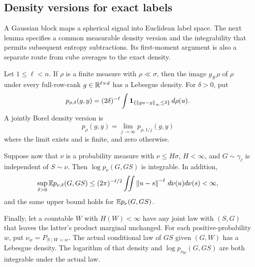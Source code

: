 \subsection{Density versions for exact labels}
\label{subsec:r-densities}

A Gaussian block maps a spherical signal into Euclidean label space.
The next lemma specifies a common measurable density version and the
integrability that permits subsequent entropy subtractions.  Its
first-moment argument is also a separate route from cube averages to
the exact density.

\begin{lemma}
\label{lem:r-projection-density}
Let \(1\le\ell<n\).  If \(\rho\) is a finite measure with
\(\rho\ll\sigma\), then the image \(g_\#\rho\) of \(\rho\) under
every full-row-rank \(g\in\mathbb R^{\ell\times d}\) has a Lebesgue density.
For \(\delta>0\), put
\[
 p_{\rho,\delta}(g,y)
   =(2\delta)^{-\ell}\int
       \mathbf 1_{\{\left\lVert gu-y\right\rVert_\infty\le\delta\}}\,d\rho(u).
\]
A jointly Borel density version is
\begin{equation}\label{eq:r-density-version}
 p_\rho(g,y)=\lim_{j\to\infty}p_{\rho,1/j}(g,y)
\end{equation}
where the limit exists and is finite, and zero otherwise.

Suppose now that \(\nu\) is a probability measure with
\(\nu\le H\sigma\), \(H<\infty\), and \(G\sim\gamma_\ell\) is
independent of \(S\sim\nu\).  Then \(\log p_\nu(G,GS)\) is
integrable.  In addition,
\begin{equation}\label{eq:r-first-density-moment}
 \sup_{\delta>0}\mathbb E p_{\nu,\delta}(G,GS)
 \le(2\pi)^{-\ell/2}
       \iint\left\lVert u-s\right\rVert^{-\ell}\,d\nu(u)d\nu(s)<\infty,
\end{equation}
and the same upper bound holds for \(\mathbb E p_\nu(G,GS)\).

Finally, let a countable \(W\) with \(H(W)<\infty\) have any joint
law with \((S,G)\) that leaves the latter's product marginal
unchanged.  For each positive-probability \(w\), put
\(\nu_w=P_{S\mid W=w}\).  The actual conditional law of \(GS\)
given \((G,W)\) has a Lebesgue density.  The logarithm of that
density and \(\log p_{\nu_W}(G,GS)\) are both integrable under the
actual law.
\end{lemma}

